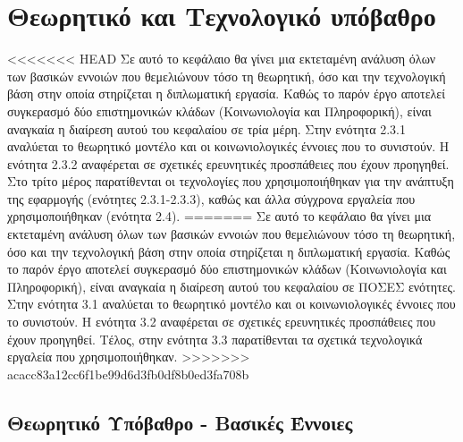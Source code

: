\chapter{Θεωρητικό και Τεχνολογικό υπόβαθρο}
\label{chap3}

<<<<<<< HEAD
Σε αυτό το κεφάλαιο θα γίνει μια εκτεταμένη ανάλυση όλων των βασικών εννοιών που θεμελιώνουν τόσο τη θεωρητική, όσο και την τεχνολογική βάση στην οποία στηρίζεται η διπλωματική εργασία. Καθώς το παρόν έργο αποτελεί συγκερασμό δύο επιστημονικών κλάδων (Κοινωνιολογία και Πληροφορική), είναι αναγκαία η διαίρεση αυτού του κεφαλαίου σε τρία μέρη. Στην ενότητα 2.3.1 αναλύεται το θεωρητικό μοντέλο και οι κοινωνιολογικές έννοιες που το συνιστούν. Η ενότητα 2.3.2 αναφέρεται σε σχετικές ερευνητικές προσπάθειες που έχουν προηγηθεί. Στο τρίτο μέρος παρατίθενται οι τεχνολογίες που χρησιμοποιήθηκαν για την ανάπτυξη της εφαρμογής (ενότητες 2.3.1-2.3.3), καθώς και άλλα σύγχρονα εργαλεία που χρησιμοποιήθηκαν (ενότητα 2.4).
=======
Σε αυτό το κεφάλαιο θα γίνει μια εκτεταμένη ανάλυση όλων των βασικών εννοιών που θεμελιώνουν τόσο τη θεωρητική, όσο και την τεχνολογική βάση στην οποία στηρίζεται η διπλωματική εργασία. Καθώς το παρόν έργο αποτελεί συγκερασμό δύο επιστημονικών κλάδων (Κοινωνιολογία και Πληροφορική), είναι αναγκαία η διαίρεση αυτού του κεφαλαίου σε ΠΟΣΕΣ ενότητες. Στην ενότητα 3.1 αναλύεται το θεωρητικό μοντέλο και οι κοινωνιολογικές έννοιες που το συνιστούν. Η ενότητα 3.2 αναφέρεται σε σχετικές ερευνητικές προσπάθειες που έχουν προηγηθεί. Τέλος, στην ενότητα 3.3 παρατίθενται τα σχετικά τεχνολογικά εργαλεία που χρησιμοποιήθηκαν.
>>>>>>> acacc83a12cc6f1be99d6d3fb0df8b0ed3fa708b

\section{Θεωρητικό Υπόβαθρο - Βασικές Έννοιες}

